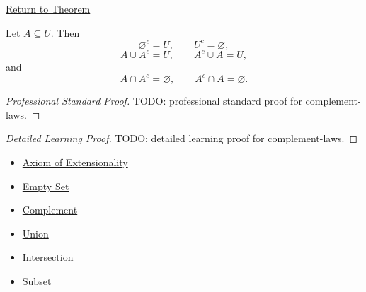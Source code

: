 \newpage
{}
\label{prf:complement-laws}

\begin{remark*}[Return]
\hyperref[thm:complement-laws]{Return to Theorem}
\end{remark*}

\begin{theorem*}
Let $A\subseteq U$. Then
\[
\varnothing^c=U,
\qquad
U^c=\varnothing,
\]
\[
A\cup A^c=U,
\qquad
A^c\cup A=U,
\]
and
\[
A\cap A^c=\varnothing,
\qquad
A^c\cap A=\varnothing.
\]
\end{theorem*}

\begin{proof}[Professional Standard Proof]
\LRAProofBodyStart
TODO: professional standard proof for complement-laws.
\end{proof}

\begin{proof}[Detailed Learning Proof]
\LRAProofBodyStart
TODO: detailed learning proof for complement-laws.
\end{proof}

\begin{remark*}
\end{remark*}

\begin{dependencies}
\begin{itemize}
  \item \hyperref[ax:extensionality]{Axiom of Extensionality}
  \item \hyperref[def:empty-set]{Empty Set}
  \item \hyperref[def:complement]{Complement}
  \item \hyperref[def:union]{Union}
  \item \hyperref[def:intersection]{Intersection}
  \item \hyperref[def:subset]{Subset}
\end{itemize}
\end{dependencies}

\clearpage
